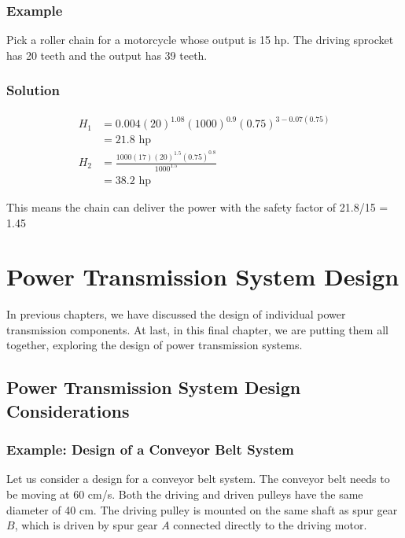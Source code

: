 \documentclass[a4paper,openany,svgnames]{kaobook}
\begin{document}
\subsection{Example}
\label{sec:org552a1e5}

Pick a roller chain for a motorcycle whose output is 15 hp. The driving sprocket has 20 teeth and the output has 39 teeth.

\subsection{Solution}
\label{sec:org677c635}

\begin{align*}
    H_1 &= 0.004(20)^{1.08}(1000)^{0.9}(0.75)^{3-0.07(0.75)} \\
        &= 21.8 \text{ hp} \\
    H_2 &= \frac{1000(17)(20)^{1.5}(0.75)^{0.8}}{1000^{1.5}} \\
        &= 38.2 \text{ hp}
\end{align*}

This means the chain can deliver the power with the safety factor of 21.8/15 = 1.45

\chapter{Power Transmission System Design}
\label{sec:org8e75d39}

In previous chapters, we have discussed the design of individual power transmission components. At last, in this final chapter, we are putting them all together, exploring the design of power transmission systems.

\section{Power Transmission System Design Considerations}
\label{sec:orgde17a5d}

\subsection{Example: Design of a Conveyor Belt System}
\label{sec:org13a8fe1}

Let us consider a design for a conveyor belt system. The conveyor belt
needs to be moving at 60 cm/s. Both the driving and driven pulleys have
the same diameter of 40 cm. The driving pulley is mounted on the same
shaft as spur gear \(B\), which is driven by spur gear \(A\) connected
directly to the driving motor.
\end{document}
